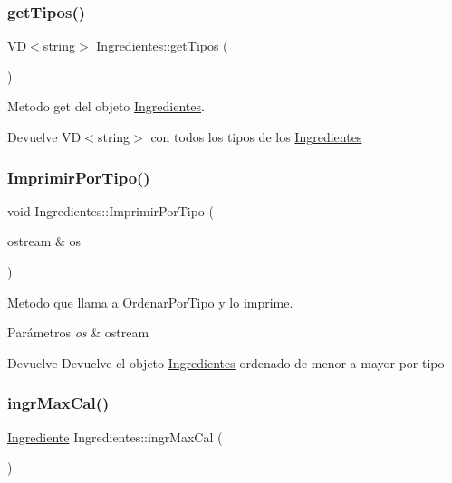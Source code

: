 \subsubsection{\texorpdfstring{get\+Tipos()}{getTipos()}}
{\footnotesize\ttfamily \hyperlink{classVD}{VD}$<$string$>$ Ingredientes\+::get\+Tipos (\begin{DoxyParamCaption}{ }\end{DoxyParamCaption})}



Metodo get del objeto \hyperlink{classIngredientes}{Ingredientes}. 

\begin{DoxyReturn}{Devuelve}
V\+D$<$string$>$ con todos los tipos de los \hyperlink{classIngredientes}{Ingredientes} 
\end{DoxyReturn}
\mbox{\label{classIngredientes_a9a3accd03d7af199cd1ee99350ab5626}} 
\subsubsection{\texorpdfstring{Imprimir\+Por\+Tipo()}{ImprimirPorTipo()}}
{\footnotesize\ttfamily void Ingredientes\+::\+Imprimir\+Por\+Tipo (\begin{DoxyParamCaption}\item[{ostream \&}]{os }\end{DoxyParamCaption})}



Metodo que llama a Ordenar\+Por\+Tipo y lo imprime. 


\begin{DoxyParams}{Parámetros}
{\em os} & ostream \\
\hline
\end{DoxyParams}
\begin{DoxyReturn}{Devuelve}
Devuelve el objeto \hyperlink{classIngredientes}{Ingredientes} ordenado de menor a mayor por tipo 
\end{DoxyReturn}
\mbox{\label{classIngredientes_a8ee9b091d59c1e3a11659d8b8e79d3cc}} 
\subsubsection{\texorpdfstring{ingr\+Max\+Cal()}{ingrMaxCal()}}
{\footnotesize\ttfamily \hyperlink{classIngrediente}{Ingrediente} Ingredientes\+::ingr\+Max\+Cal (\begin{DoxyParamCaption}{ }\end{DoxyParamCaption})}



